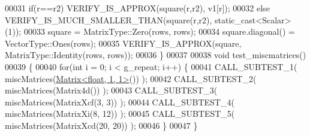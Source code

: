 \begin{DoxyCode}
00031   \textcolor{keywordflow}{if}(r==r2) VERIFY\_IS\_APPROX(square(r,r2), v1[r]);
00032   \textcolor{keywordflow}{else} VERIFY\_IS\_MUCH\_SMALLER\_THAN(square(r,r2), static\_cast<Scalar>(1));
00033   square = MatrixType::Zero(rows, rows);
00034   square.diagonal() = VectorType::Ones(rows);
00035   VERIFY\_IS\_APPROX(square, MatrixType::Identity(rows, rows));
00036 \}
00037 
00038 \textcolor{keywordtype}{void} test\_miscmatrices()
00039 \{
00040   \textcolor{keywordflow}{for}(\textcolor{keywordtype}{int} i = 0; i < g\_repeat; i++) \{
00041     CALL\_SUBTEST\_1( miscMatrices(\hyperlink{group___core___module_class_eigen_1_1_matrix}{Matrix<float, 1, 1>}()) );
00042     CALL\_SUBTEST\_2( miscMatrices(Matrix4d()) );
00043     CALL\_SUBTEST\_3( miscMatrices(MatrixXcf(3, 3)) );
00044     CALL\_SUBTEST\_4( miscMatrices(MatrixXi(8, 12)) );
00045     CALL\_SUBTEST\_5( miscMatrices(MatrixXcd(20, 20)) );
00046   \}
00047 \}
\end{DoxyCode}
